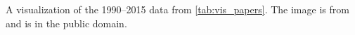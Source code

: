 \label{fig:sample} A visualization of the 1990--2015 data from \autoref{tab:vis_papers}. The image is from \cite{Isenberg:2017:VMC} and is in the public domain.